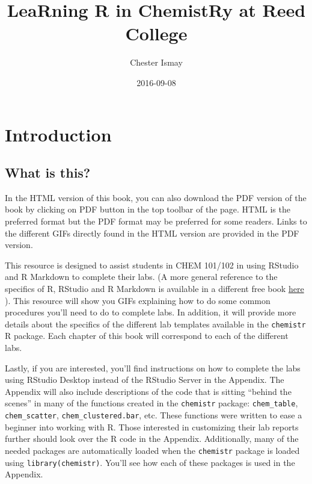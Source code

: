 \documentclass[]{tufte-book}
\title{LeaRning R in ChemistRy at Reed College}
\author{Chester Ismay}
\date{2016-09-08}
\begin{document}
\maketitle



{
\setcounter{tocdepth}{1}
\tableofcontents
}

\chapter*{Introduction}\label{introduction}

\section*{What is this?}\label{what-is-this}

In the HTML version of this book, you can also download the PDF version
of the book by clicking on PDF button in the top toolbar of the page.
HTML is the preferred format but the PDF format may be preferred for
some readers. Links to the different GIFs directly found in the HTML
version are provided in the PDF version.

This resource is designed to assist students in CHEM 101/102 in using
RStudio and R Markdown to complete their labs. (A more general reference
to the specifics of R, RStudio and R Markdown is available in a
different free book \href{http://ismayc.github.io/rbasics-book}{here}
\citep{usedtor2016}). This resource will show you GIFs explaining how to
do some common procedures you'll need to do to complete labs. In
addition, it will provide more details about the specifics of the
different lab templates available in the \texttt{chemistr} R package.
Each chapter of this book will correspond to each of the different labs.

Lastly, if you are interested, you'll find instructions on how to
complete the labs using RStudio Desktop instead of the RStudio Server in
the Appendix. The Appendix will also include descriptions of the code
that is sitting ``behind the scenes'' in many of the functions created
in the \texttt{chemistr} package: \texttt{chem\_table},
\texttt{chem\_scatter}, \texttt{chem\_clustered.bar}, etc. These
functions were written to ease a beginner into working with R. Those
interested in customizing their lab reports further should look over the
R code in the Appendix. Additionally, many of the needed packages are
automatically loaded when the \texttt{chemistr} package is loaded using
\texttt{library(chemistr)}. You'll see how each of these packages is
used in the Appendix.
\end{document}
